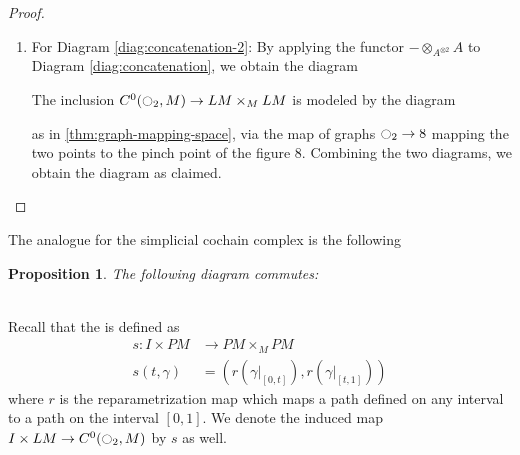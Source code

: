 \documentclass{scrartcl}
\let\emph\relax
\theoremstyle{plain}
\newtheorem{proposition}[theorem]{Proposition}
\theoremstyle{definition}
\newcommand{\blank}{-}
\begin{document}
\begin{proof}
\begin{enumerate}
    \item For Diagram \ref{diag:concatenation-2}: By applying the functor $\blank \otimes_{A^{\otimes 2}} A$ to Diagram \ref{diag:concatenation}, we obtain the diagram
    \begin{center}
    \end{center}
    The inclusion $ C^0(\ocircle_2, M)\to LM\times_M LM$ is modeled by the diagram
    \begin{center}
    \end{center}
    as in \ref{thm:graph-mapping-space}, via the map of graphs $\ocircle_2\to 8$ mapping the two points to the pinch point of the figure $8$. Combining the two diagrams, we obtain the diagram as claimed.
\end{enumerate}
\end{proof}

The analogue for the simplicial cochain complex is the following
\begin{proposition}
    The following diagram commutes:
\begin{center}
\end{center}
\end{proposition}

\ \\[0.5cm]

Recall that the \emph{splitting map} is defined as
\begin{align*} 
    s\colon I\times PM &\to PM\times_M PM\\
    s(t, \gamma)&=\left(r(\gamma|_{[0, t]}) , r(\gamma|_{[t, 1]})\right)
\end{align*}
where $r$ is the reparametrization map which maps a path defined on any interval to a path on the interval $[0,1]$. We denote the induced map $I\times LM\to C^0(\ocircle_2, M)$ by $s$ as well.
\end{document}
